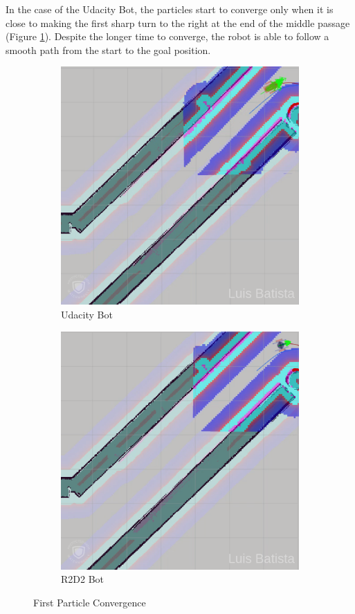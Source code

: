 \documentclass[10pt,journal,compsoc]{IEEEtran}
\begin{document}
In the case of the Udacity Bot, the particles start to converge only when it is close to making the first sharp turn to the right at the end of the middle passage (Figure \ref{fig:ub-3}). Despite the longer time to converge, the robot is able to follow a smooth path from the start to the goal position.

\begin{figure}[H]
\centering
\begin{subfigure}{.5\linewidth}
  \centering
  \includegraphics[width=.95\linewidth]{ub_3.png}
  \caption{Udacity Bot}
  \label{fig:ub-3}
\end{subfigure}%
\begin{subfigure}{.5\linewidth}
  \centering
  \includegraphics[width=.95\linewidth]{r2d2_3.png}
  \caption{R2D2 Bot}
  \label{fig:r2d2-3}
\end{subfigure}
\caption{First Particle Convergence}
\label{fig:conv2}
\end{figure}
\end{document}
